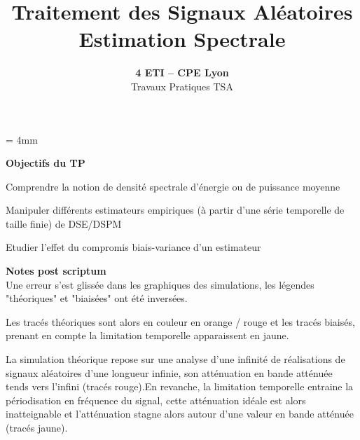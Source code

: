 \documentclass{article}
\begin{document}
\baselineskip = 4mm
\title{Traitement des Signaux Aléatoires \\
Estimation Spectrale}
\author{\textbf{4 ETI -- CPE Lyon }\\[3mm]
{Travaux Pratiques TSA}}
\date{}

\maketitle

\noindent{}
\vspace*{5mm}


\textbf{\Large Objectifs du TP}\\[4mm]

\begin{list}{-}{\setlength{\leftmargin}{3mm} \setlength{\labelwidth}{20mm} \setlength{\labelsep}{2mm} \setlength{\itemsep}{1mm} }
\item Comprendre la notion de densité spectrale d'énergie ou de puissance moyenne
\item Manipuler différents estimateurs empiriques (à partir d'une série temporelle de taille finie) de DSE/DSPM
\item Etudier l'effet du compromis biais-variance d'un estimateur
\end{list}

\textbf{\Large Notes post scriptum}\\[4mm]
Une erreur s'est glissée dans les graphiques des simulations, les légendes "théoriques" et "biaisées" ont été inversées.

Les tracés théoriques sont alors en couleur en orange / rouge et les tracés biaisés, prenant en compte la limitation temporelle apparaissent en jaune.\newline

La simulation théorique repose sur une analyse d'une infinité de réalisations de signaux aléatoires d'une longueur infinie, son atténuation en bande atténuée tends vers l'infini (tracés rouge).En revanche, la limitation temporelle entraine la périodisation en fréquence du signal, cette atténuation idéale est alors inatteignable et l'atténuation stagne alors autour d'une valeur en bande atténuée (tracés jaune).
\end{document}
